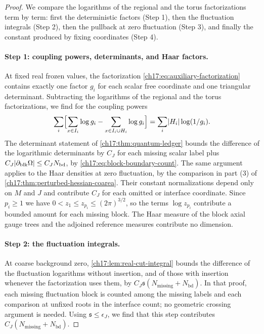 \begin{proof}
We compare the logarithms of the regional and the torus factorizations term by term: first the deterministic factors (Step 1), then the fluctuation integrals (Step 2), then the pullback at zero fluctuation (Step 3), and finally the constant produced by fixing coordinates (Step 4).

\paragraph{Step 1: coupling powers, determinants, and Haar factors.}
At fixed real frozen values, the factorization \eqref{ch17:eq:auxiliary-factorization} contains exactly one factor $g_i$ for each scalar free coordinate and one triangular determinant. Subtracting the logarithms of the regional and the torus factorizations, we find for the coupling powers
\[
 \sum_i\Bigl[\sum_{x\in I_i}\log g_i-\sum_{x\in I_i\cup H_i}\log g_i\Bigr]=\sum_i\lvert H_i\rvert\log(1/g_i).
\]
The determinant statement of \cref{ch17:thm:quantum-ledger} bounds the difference of the logarithmic determinants by $C_J$ for each missing scalar label plus $C_J\lvert \partial_{\mathrm{blk}}\Omega\rvert\le C_JN_{\mathrm{bd}}$, by \eqref{ch17:eq:block-boundary-count}. The same argument applies to the Haar densities at zero fluctuation, by the comparison in part (3) of \cref{ch17:thm:perturbed-hessian-coarea}. Their constant normalizations depend only on $M$ and $J$ and contribute $C_J$ for each omitted or interface coordinate. Since $p_i\ge1$ we have $0<z_1\le z_{p_i}\le(2\pi)^{3/2}$, so the terms $\log z_{p_i}$ contribute a bounded amount for each missing block. The Haar measure of the block axial gauge trees and the adjoined reference measures contribute no dimension.

\paragraph{Step 2: the fluctuation integrals.}
At coarse background zero, \cref{ch17:lem:real-cut-integral} bounds the difference of the fluctuation logarithms without insertion, and of those with insertion whenever the factorization uses them, by $C_J\mathfrak s(N_{\mathrm{missing}}+N_{\mathrm{bd}})$. In that proof, each missing fluctuation block is counted among the missing labels and each comparison at unfixed roots in the interface count; no geometric crossing argument is needed. Using $\mathfrak s\le\epsilon_J$, we find that this step contributes $C_J(N_{\mathrm{missing}}+N_{\mathrm{bd}})$.


\end{proof}
